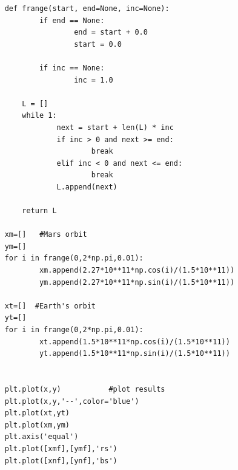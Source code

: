 \documentclass[twocolumn,12pt,a4paper]{article}
\numberwithin{equation}{section}
\begin{document}
\begin{verbatim}
	def frange(start, end=None, inc=None):
			if end == None:
					end = start + 0.0
					start = 0.0
	
			if inc == None:
					inc = 1.0
	
		L = []
		while 1:
				next = start + len(L) * inc
				if inc > 0 and next >= end:
						break
				elif inc < 0 and next <= end:
						break
				L.append(next)
	
		return L
	
	xm=[]   #Mars orbit
	ym=[]
	for i in frange(0,2*np.pi,0.01):
			xm.append(2.27*10**11*np.cos(i)/(1.5*10**11))
			ym.append(2.27*10**11*np.sin(i)/(1.5*10**11))
	
	xt=[]  #Earth's orbit
	yt=[]
	for i in frange(0,2*np.pi,0.01):
			xt.append(1.5*10**11*np.cos(i)/(1.5*10**11))
			yt.append(1.5*10**11*np.sin(i)/(1.5*10**11))
	
	
	plt.plot(x,y)			#plot results
	plt.plot(x,y,'--',color='blue')
	plt.plot(xt,yt)
	plt.plot(xm,ym)
	plt.axis('equal')
	plt.plot([xmf],[ymf],'rs')
	plt.plot([xnf],[ynf],'bs')

	
\end{verbatim}
\end{document}
